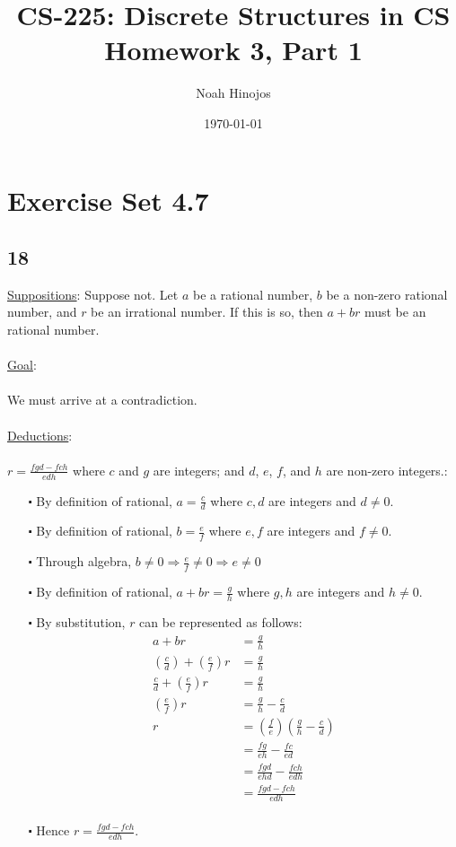 \documentclass[12pt]{article}
\title{
  \textbf{CS-225: Discrete Structures in CS} \\
  Homework 3, Part 1
  }
\author{Noah Hinojos}
\date{\today}
\begin{document}
\maketitle

\section*{Exercise Set 4.7}
\subsection*{18}
\underline{Suppositions}:
Suppose not. Let $a$ be a rational number, $b$ be a non-zero rational number, and $r$ be an irrational number.
If this is so, then $a+br$ must be an rational number.
\\ \\
\underline{Goal}:
\\ \\
We must arrive at a contradiction.
\\ \\
\underline{Deductions}:
\\ \\
$r= \frac{fgd - fch}{edh}$ where $c$ and $g$ are integers; and $d$, $e$, $f$, and $h$ are non-zero integers.:
\begin{itemize}
  \item [$\centerdot$] By definition of rational, $a = \frac{c}{d}$ where $c,d$ are integers and $d \neq 0$. 
  \item [$\centerdot$] By definition of rational, $b = \frac{e}{f}$ where $e,f$ are integers and $f \neq 0$.
  \item [$\centerdot$] Through algebra, $b \neq 0 \Rightarrow \frac{e}{f} \neq 0 \Rightarrow e \neq 0$ 
  \item [$\centerdot$] By definition of rational, $a+br = \frac{g}{h}$ where $g,h$ are integers and $h \neq 0$.
  \item [$\centerdot$] By substitution, $r$ can be represented as follows:
  \begin{align*}
    a+br &= \frac{g}{h} \\
    \left(\frac{c}{d}\right) + \left(\frac{e}{f}\right)r &= \frac{g}{h}\\
    \frac{c}{d} + \left(\frac{e}{f}\right)r &= \frac{g}{h}\\
    \left(\frac{e}{f}\right)r &= \frac{g}{h} - \frac{c}{d} \\
    r &= \left(\frac{f}{e}\right)\left(\frac{g}{h} - \frac{c}{d}\right)  \\
    &= \frac{fg}{eh} - \frac{fc}{ed} \\
    &= \frac{fgd}{ehd} - \frac{fch}{edh} \\
    &= \frac{fgd - fch}{edh} \\
  \end{align*}
  \item [$\centerdot$] Hence $r = \frac{fgd - fch}{edh}$.
\end{itemize}
\end{document}
